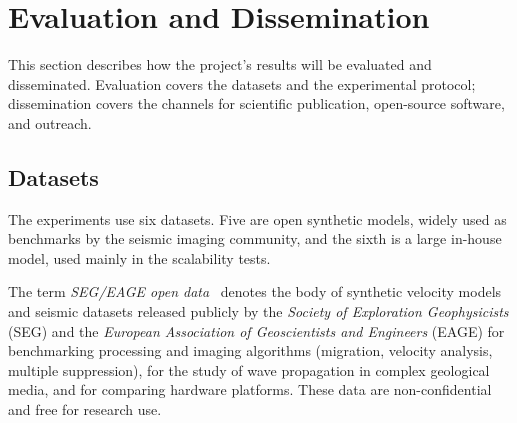 \documentclass[12pt,a4paper]{article}
\begin{document}
\fi

\section{Evaluation and Dissemination}

This section describes how the project's results will be evaluated and
disseminated. Evaluation covers the datasets and the experimental
protocol; dissemination covers the channels for scientific publication,
open-source software, and outreach.

\subsection{Datasets}

The experiments use six datasets. Five are open synthetic models, widely
used as benchmarks by the seismic imaging community, and the sixth is a
large in-house model, used mainly in the scalability tests.

The term \emph{SEG/EAGE open data}~\cite{segopendata} denotes the body of
synthetic velocity models and seismic datasets released publicly by the
\emph{Society of Exploration Geophysicists} (SEG) and the \emph{European
Association of Geoscientists and Engineers} (EAGE) for benchmarking
processing and imaging algorithms (migration, velocity analysis, multiple
suppression), for the study of wave propagation in complex geological
media, and for comparing hardware platforms. These data are
non-confidential and free for research use.
\end{document}
